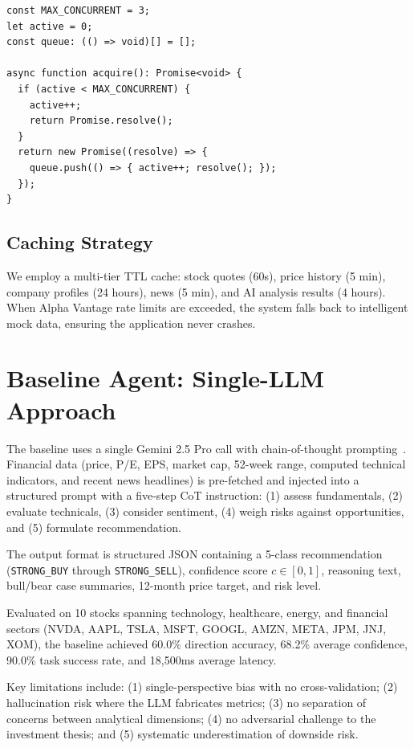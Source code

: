 \documentclass[conference]{IEEEtran}
\begin{document}
\begin{lstlisting}[caption={Semaphore-based concurrency control.}, label={lst:semaphore}]
const MAX_CONCURRENT = 3;
let active = 0;
const queue: (() => void)[] = [];

async function acquire(): Promise<void> {
  if (active < MAX_CONCURRENT) {
    active++;
    return Promise.resolve();
  }
  return new Promise((resolve) => {
    queue.push(() => { active++; resolve(); });
  });
}
\end{lstlisting}

\subsection{Caching Strategy}

We employ a multi-tier TTL cache: stock quotes (60s), price history (5 min), company profiles (24 hours), news (5 min), and AI analysis results (4 hours). When Alpha Vantage rate limits are exceeded, the system falls back to intelligent mock data, ensuring the application never crashes.


\section{Baseline Agent: Single-LLM Approach}
\label{sec:baseline}

The baseline uses a single Gemini 2.5 Pro call with chain-of-thought prompting~\cite{wei2022chainofthought}. Financial data (price, P/E, EPS, market cap, 52-week range, computed technical indicators, and recent news headlines) is pre-fetched and injected into a structured prompt with a five-step CoT instruction: (1) assess fundamentals, (2) evaluate technicals, (3) consider sentiment, (4) weigh risks against opportunities, and (5) formulate recommendation.

The output format is structured JSON containing a 5-class recommendation (\texttt{STRONG\_BUY} through \texttt{STRONG\_SELL}), confidence score $c \in [0, 1]$, reasoning text, bull/bear case summaries, 12-month price target, and risk level.

Evaluated on 10 stocks spanning technology, healthcare, energy, and financial sectors (NVDA, AAPL, TSLA, MSFT, GOOGL, AMZN, META, JPM, JNJ, XOM), the baseline achieved 60.0\% direction accuracy, 68.2\% average confidence, 90.0\% task success rate, and 18,500ms average latency.

Key limitations include: (1) single-perspective bias with no cross-validation; (2) hallucination risk where the LLM fabricates metrics; (3) no separation of concerns between analytical dimensions; (4) no adversarial challenge to the investment thesis; and (5) systematic underestimation of downside risk.
\end{document}
